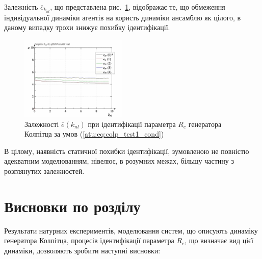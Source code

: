 Залежність
$\overline{e}_{k_{nl}} $, що представлена рис.~\ref{atu:f:colp_real_id_p_k_nl_d_0},
відображає те, що обмеження індивідуальної динаміки агентів
на користь динаміки ансамблю як цілого, в даному випадку трохи
знижує похибку ідентифікації.

\begin{figure}[htb!]
  \centerline{\includegraphics[width=0.45\textwidth]{p/r/colp_real_id-p_k_nl_d_0.png} }
\caption{Залежності $ \overline{e} (k_{nl}) $ при ідентифікації параметра $ R_c $ генератора Колпітца за умов (\ref{atu:eq:colp_test1_cond})}
  \label{atu:f:colp_real_id_p_k_nl_d_0}
\end{figure}
%
%

В цілому, наявність статичної похибки ідентифікації, зумовленою
не повністю адекватним моделюванням, нівелює, в розумних межах,
більшу частину з розглянутих залежностей.




\section{Висновки по розділу \thechapter} %

Результати натурних експериментів, моделювання систем, що
описують динаміку генератора Колпітца, процесів ідентифікації
параметра
$R_c $, що визначає вид цієї динаміки, дозволяють зробити наступні
висновки:

